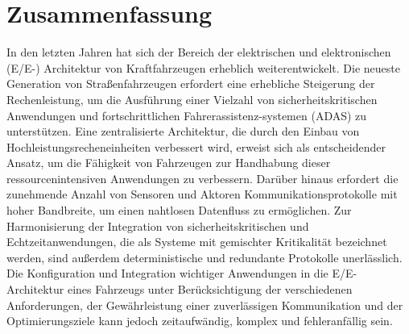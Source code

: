 %
%

        \newpage%
         \thispagestyle{empty}\vspace*{2cm}%
\section*{Zusammenfassung}%
       In den letzten Jahren hat sich der Bereich der elektrischen und elektronischen (E/E-) Architektur von Kraftfahrzeugen erheblich weiterentwickelt. Die neueste Generation von Straßenfahrzeugen erfordert eine erhebliche Steigerung der Rechenleistung, um die Ausführung einer Vielzahl von sicherheitskritischen Anwendungen und fortschrittlichen Fahrerassistenz-systemen (ADAS) zu unterstützen. Eine zentralisierte Architektur, die durch den Einbau von Hochleistungsrecheneinheiten verbessert wird, erweist sich als entscheidender Ansatz, um die Fähigkeit von Fahrzeugen zur Handhabung dieser ressourcenintensiven Anwendungen zu verbessern. Darüber hinaus erfordert die zunehmende Anzahl von Sensoren und Aktoren Kommunikationsprotokolle mit hoher Bandbreite, um einen nahtlosen Datenfluss zu ermöglichen. Zur Harmonisierung der Integration von sicherheitskritischen und Echtzeitanwendungen, die als Systeme mit gemischter Kritikalität bezeichnet werden, sind außerdem deterministische und redundante Protokolle unerlässlich.
        Die Konfiguration und Integration wichtiger Anwendungen in die E/E-Architektur eines Fahrzeugs unter Berücksichtigung der verschiedenen Anforderungen, der Gewährleistung einer zuverlässigen Kommunikation und der Optimierungsziele kann jedoch zeitaufwändig, komplex und fehleranfällig sein. 

